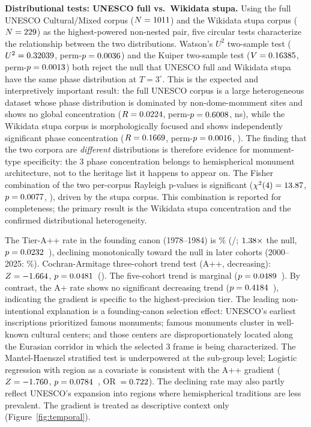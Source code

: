 \noindent\textbf{Distributional tests: UNESCO full vs.\ Wikidata stupa.}
Using the full UNESCO Cultural/Mixed corpus ($N=1011{}$)
and the Wikidata stupa corpus ($N=229{}$) as the
highest-powered non-nested pair, five circular tests characterize the
relationship between the two distributions.
Watson's $U^2$ two-sample test ($U^2=0.32039{}$,
perm-$p=0.0036{}$) and the Kuiper two-sample
test ($V=0.16385{}$,
perm-$p=0.0013{}$) both reject the null that
UNESCO full and Wikidata stupa have the same phase distribution at
$T=3^\circ$. This is the expected and interpretively important result:
the full UNESCO corpus is a large heterogeneous dataset whose phase
distribution is dominated by non-dome-monument sites and shows no
global concentration ($R=0.0224{}$, perm-$p=0.6008{}$, ns),
while the Wikidata stupa corpus is morphologically focused and shows
independently significant phase concentration
($R=0.1669{}$, perm-$p=0.0016{}$, \circConcStupaPSig{}).
The finding that the two corpora are \emph{different} distributions is
therefore evidence for monument-type specificity: the 3\textdegree{}
phase concentration belongs to hemispherical monument architecture,
not to the heritage list it happens to appear on.
The Fisher combination of the two per-corpus Rayleigh
p-values is significant ($\chi^2(4)=13.87{}$,
$p=0.0077{}$, \circConcUnescoStupaFisherPSig{}),
driven by the stupa corpus. This combination is reported for
completeness; the primary result is the Wikidata stupa concentration
and the confirmed distributional heterogeneity.


\label{sec:resultstemporal}

The Tier-A++ rate in the founding canon (1978--1984) is \cohortAppArate\%
(\NcohortAppAapp/\NcohortAppA{}; $1.38\times$ the \NullRateApp{} null,
$p = 0.0232$~\pCanonAppSig{}), declining monotonically toward the null
in later cohorts (2000--2025: \cohortAppErate\%).
Cochran-Armitage three-cohort trend test (A++, decreasing):
$Z = -1.664$, $p = 0.0481$~(\pCochranAppThreeSig{}).
The five-cohort trend is marginal ($p = 0.0489$~\pCochranAppFiveSig{}).
By contrast, the A+ rate shows no significant decreasing trend
($p = 0.4184$~\pCochranThreeSig{}), indicating the gradient is
specific to the highest-precision tier.
The leading non-intentional explanation is a founding-canon selection
effect: UNESCO's earliest inscriptions prioritized famous monuments;
famous monuments cluster in well-known cultural centers; and those
centers are disproportionately located along the Eurasian corridor in
which the selected 3\textdegree{} frame is being characterized.
The Mantel-Haenszel stratified test is underpowered at the sub-group level;
Logistic regression with region as a covariate is consistent with the A++ gradient
($Z = -1.760$, $p = 0.0784$~\pLogRegCohortAppSig{},
OR~$= 0.722$).
The declining rate may also partly reflect UNESCO's expansion into
regions where hemispherical traditions are less prevalent.
The gradient is treated as descriptive context only (Figure~\ref{fig:temporal}).

